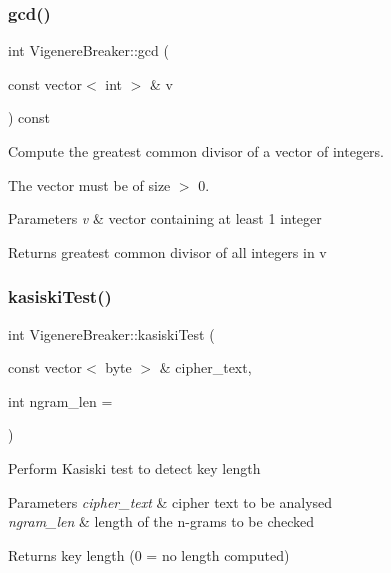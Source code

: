 \subsubsection{\texorpdfstring{gcd()}{gcd()}\hspace{0.1cm}{\footnotesize\ttfamily [2/2]}}
{\footnotesize\ttfamily int Vigenere\+Breaker\+::gcd (\begin{DoxyParamCaption}\item[{const vector$<$ int $>$ \&}]{v }\end{DoxyParamCaption}) const\hspace{0.3cm}{\ttfamily [protected]}}

Compute the greatest common divisor of a vector of integers.

The vector must be of size $>$ 0.


\begin{DoxyParams}{Parameters}
{\em v} & vector containing at least 1 integer\\
\hline
\end{DoxyParams}
\begin{DoxyReturn}{Returns}
greatest common divisor of all integers in v 
\end{DoxyReturn}
\mbox{\label{classVigenereBreaker_aaa9154379a64b4d3e63c21abdc8a2270}} 
\subsubsection{\texorpdfstring{kasiski\+Test()}{kasiskiTest()}}
{\footnotesize\ttfamily int Vigenere\+Breaker\+::kasiski\+Test (\begin{DoxyParamCaption}\item[{const vector$<$ byte $>$ \&}]{cipher\+\_\+text,  }\item[{int}]{ngram\+\_\+len = {} }\end{DoxyParamCaption})}

Perform Kasiski test to detect key length


\begin{DoxyParams}{Parameters}
{\em cipher\+\_\+text} & cipher text to be analysed \\
\hline
{\em ngram\+\_\+len} & length of the n-\/grams to be checked\\
\hline
\end{DoxyParams}
\begin{DoxyReturn}{Returns}
key length (0 = no length computed) 
\end{DoxyReturn}
\mbox{\label{classVigenereBreaker_ac507990f1124fbbb419d0444fea290c4}} 
